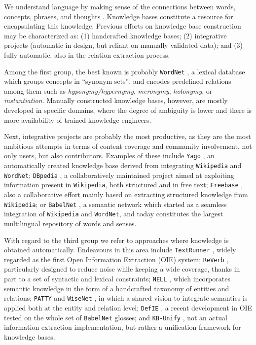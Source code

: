 We understand language by making sense of the connections between words, concepts, phrases, and thoughts \citep{Havasietal2007}. Knowledge bases constitute a resource for encapsulating this knowledge. Previous efforts on knowledge base construction may be characterized as: (1) handcrafted knowledge bases; (2) integrative projects (automatic in design, but reliant on manually validated data); and (3) fully automatic, also in the relation extraction process.

Among the first group, the best known is probably \texttt{WordNet} \citep{wordnet}, a lexical database which groups concepts in ``synonym sets'', and encodes predefined relations among them such as \textit{hyponymy/hypernymy}, \textit{meronymy}, \textit{holonymy}, or \textit{instantiation}. Manually constructed knowledge bases, however, are mostly developed in specific domains, where the degree of ambiguity is lower and there is more availability of trained knowledge engineers.

Next, integrative projects are probably the most productive, as they are the most ambitious attempts in terms of content coverage and community involvement, not only users, but also contributors. Examples of these include \texttt{Yago} \citep{Suchaneketal2007}, an automatically created knowledge base derived from integrating \texttt{Wikipedia} and \texttt{WordNet}; \texttt{DBpedia} \citep{Lehmanetal2014}, a collaboratively maintained project aimed at exploiting information present in \texttt{Wikipedia}, both structured and in free text; \texttt{Freebase} \citep{Bollacketal2008}, also a collaborative effort mainly based on extracting structured knowledge from \texttt{Wikipedia}; or \texttt{BabelNet} \citep{NavigliPonzetto2012}, a semantic network which started as a seamless integration of \texttt{Wikipedia} and \texttt{WordNet}, and today constitutes the largest multilingual repository of words and senses.

With regard to the third group we refer to approaches where knowledge is obtained automatically. 
Endeavours in this area include \texttt{TextRunner} \citep{Bankoetal2007}, widely regarded as the first Open Information Extraction (OIE) system; \texttt{ReVerb} \citep{Fader2011}, particularly designed to reduce noise while keeping a wide coverage, thanks in part to a set of syntactic and lexical constraints; \texttt{NELL} \citep{Carlson2010}, which incorporates semantic knowledge in the form of a handcrafted taxonomy of entities and relations; \texttt{PATTY} \citep{Nakasholeetal2012} and \texttt{WiseNet} \citep{MoroandNavigli2012,MoroandNavigli2013}, in which a shared vision to integrate semantics is applied both at the entity and relation level; \texttt{DefIE} \citep{DelliBovietal2015b}, a recent development in OIE tested on the whole set of \texttt{BabelNet} glosses; and \texttt{KB-Unify} \citep{DelliBovietal2015}, not an actual information extraction implementation, but rather a unification framework for knowledge bases.

